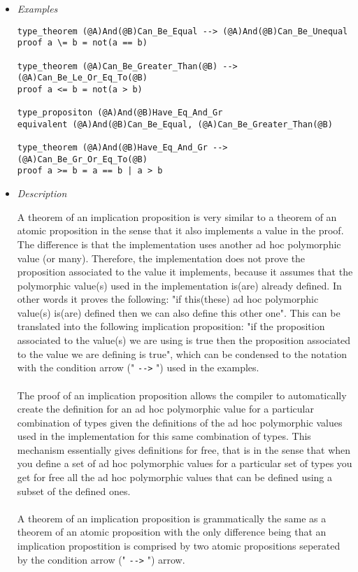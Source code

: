 \documentclass{article}
\begin{document}
\begin{itemize}
\item \textit{Examples}

\begin{verbatim}
type_theorem (@A)And(@B)Can_Be_Equal --> (@A)And(@B)Can_Be_Unequal
proof a \= b = not(a == b)

type_theorem (@A)Can_Be_Greater_Than(@B) --> (@A)Can_Be_Le_Or_Eq_To(@B)
proof a <= b = not(a > b)

type_propositon (@A)And(@B)Have_Eq_And_Gr
equivalent (@A)And(@B)Can_Be_Equal, (@A)Can_Be_Greater_Than(@B)

type_theorem (@A)And(@B)Have_Eq_And_Gr --> (@A)Can_Be_Gr_Or_Eq_To(@B)
proof a >= b = a == b | a > b
\end{verbatim}

\item \textit{Description}

A theorem of an implication proposition is very similar to a theorem of an
atomic proposition in the sense that it also implements a value in the proof.
The difference is that the implementation uses another ad hoc polymorphic value
(or many). Therefore, the implementation does not prove the proposition
associated to the value it implements, because it assumes that the polymorphic
value(s) used in the implementation is(are) already defined. In other words it
proves the following: "if this(these) ad hoc polymorphic value(s) is(are)
defined then we can also define this other one". This can be translated into
the following implication proposition: "if the proposition associated to the
value(s) we are using is true then the proposition associated to the value we
are defining is true", which can be condensed to the notation with the
condition arrow (" \verb|-->| ") used in the examples.
\\\\
The proof of an implication proposition allows the compiler to
automatically create the definition for an ad hoc polymorphic value for a
particular combination of types given the definitions of the ad hoc polymorphic
values used in the implementation for this same combination of types. This
mechanism essentially gives definitions for free, that is in the sense that
when you define a set of ad hoc polymorphic values for a particular set of
types you get for free all the ad hoc polymorphic values that can be defined
using a subset of the defined ones. 
\\\\
A theorem of an implication proposition is grammatically the same as
a theorem of an atomic proposition with the only difference being that an 
implication propostition is comprised by two atomic propositions seperated by
the condition arrow (" \verb|-->| ") arrow.

\end{itemize}
\end{document}
